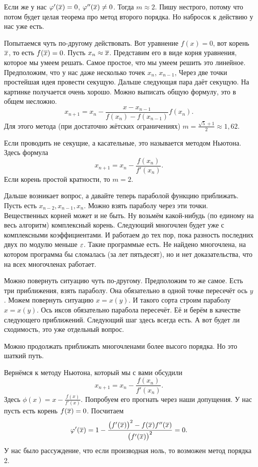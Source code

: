 Если же у нас $\varphi'(\overline{x}) = 0$, $\varphi''(\overline{x})\ne 0$. Тогда $m\approx 2$. Пишу нестрого, потому что потом будет целая теорема про метод второго порядка. Но набросок к действию у нас уже есть.

Попытаемся чуть по-другому действовать. Вот уравнение $f(x)=0$, вот корень $\overline{x}$, то есть $f(\overline{x})=0$. Пусть $x_n\approx \overline{x}$. Представим его в виде корня уравнения, которое мы умеем решать. Самое простое, что мы умеем решить это линейное. Предположим, что у нас даже несколько точек $x_n$, $x_{n-1}$, \ldotst{} Через две точки простейшая идея провести секущую. Дальше следующая пара даёт секущую. На картинке получается очень хорошо.
Можно выписать общую формулу, это в общем несложно.
\[
  x_{n+1} = x_n - \frac{x-x_{n-1}}{f(x_n) - f(x_{n-1})} f(x_n).
\]
Для этого метода (при достаточно жётских ограничениях) $m = \frac{\sqrt{5} + 1}2\approx 1{,}62$.

Если проводить не секущие, а касательные, это называется методом Ньютона. 
Здесь формула
\[
  x_{n+1} = x_n - \frac{f(x_n)}{f'(x_n)}.
\]
Если корень простой кратности, то $m=2$.

Дальше возникает вопрос, а давайте теперь параболой функцию приближать. Пусть есть $x_{n-2},x_{n-1},x_n$.
Можно взять параболу через эти точки. Вещественных корней может и не быть. Ну возьмём какой-нибудь (по единому на весь алгоритм) комплексный корень. Следующий многочлен будет уже с комплексными коэффициентами. И работаем до тех пор, пока разность последних двух по модулю меньше $\varepsilon$. Такие программые есть. Не найдено многочлена, на котором программа бы сломалась (за лет пятьдесят), но и нет доказательства, что на всех многочленах работает.

Можно повернуть ситуацию чуть по-другому. Предположим то же самое. Есть три приближения, взять параболу. Она обязательно в одной точке пересечёт ось $y$. Можем повернуть ситуацию $x = x(y)$.  И такого сорта строим параболу $x = x(y)$. Ось иксов обязательно парабола пересечёт. Её и берём в качестве следующего приближений. Следующий шаг здесь всегда есть. А вот будет ли сходимость, это уже отдельный вопрос.

Можно продолжать приближать многочленами более высого порядка. Но это шаткий путь.

Вернёмся к методу Ньютона, который мы с вами обсудили
\[
  x_{n+1} = x_n - \frac{f(x_n)}{f'(x_n)}.
\]
Здесь $\phi(x) = x - \frac{f(x)}{f'(x)}$. Попробуем его прогнать через наши допущения. У нас пусть есть корень $f(\overline{x}) = 0$. Посчитаем
\[
  \varphi'(\overline{x}) = 1 - \frac{\big(f'(\overline{x})\big)^2 -f(\overline{x})f''(\overline{x})}{\big(f'(\overline{x})\big)^2} = 0.
\]
У нас было рассуждение, что если производная ноль, то возможен метод порядка 2.


